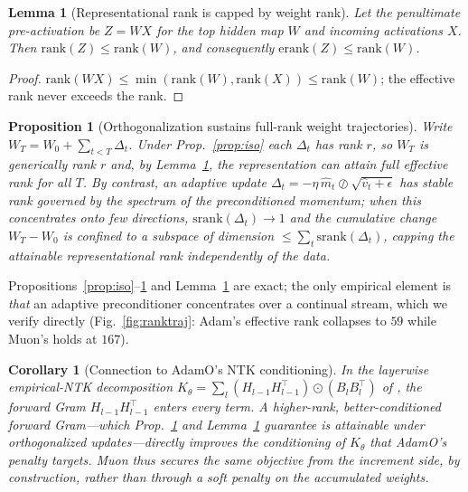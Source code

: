 \documentclass[letterpaper,twocolumn,10pt]{article}
\newtheorem{proposition}{Proposition}
\newtheorem{lemma}{Lemma}
\newtheorem{corollary}{Corollary}
\begin{document}
\begin{lemma}[Representational rank is capped by weight rank]\label{lem:cap}
Let the penultimate pre-activation be $Z=WX$ for the top hidden map $W$ and incoming activations $X$. Then $\mathrm{rank}(Z)\le\mathrm{rank}(W)$, and consequently $\mathrm{erank}(Z)\le\mathrm{rank}(W)$.
\end{lemma}
\begin{proof}
$\mathrm{rank}(WX)\le\min(\mathrm{rank}(W),\mathrm{rank}(X))\le\mathrm{rank}(W)$; the effective rank never exceeds the rank.
\end{proof}

\begin{proposition}[Orthogonalization sustains full-rank weight trajectories]\label{prop:traj}
Write $W_T=W_0+\sum_{t<T}\Delta_t$. Under Prop.~\ref{prop:iso} each $\Delta_t$ has rank $r$, so $W_T$ is generically rank $r$ and, by Lemma~\ref{lem:cap}, the representation can attain full effective rank for \emph{all} $T$. By contrast, an adaptive update $\Delta_t=-\eta\,\hat m_t\oslash\sqrt{\hat v_t+\epsilon}$ has stable rank governed by the spectrum of the preconditioned momentum; when this concentrates onto few directions, $\mathrm{srank}(\Delta_t)\!\to\!1$ and the cumulative change $W_T-W_0$ is confined to a subspace of dimension $\le\sum_t\mathrm{srank}(\Delta_t)$, capping the attainable representational rank independently of the data.
\end{proposition}

Propositions~\ref{prop:iso}--\ref{prop:traj} and Lemma~\ref{lem:cap} are exact; the only empirical element is \emph{that} an adaptive preconditioner concentrates over a continual stream, which we verify directly (Fig.~\ref{fig:ranktraj}: Adam's effective rank collapses to $59$ while Muon's holds at $167$).

\begin{corollary}[Connection to AdamO's NTK conditioning]\label{cor:ntk}
In the layerwise empirical-NTK decomposition $K_\theta=\sum_l (H_{l-1}H_{l-1}^\top)\odot(B_{l}B_{l}^\top)$ of \citet{adamo2026}, the forward Gram $H_{l-1}H_{l-1}^\top$ enters every term. A higher-rank, better-conditioned forward Gram---which Prop.~\ref{prop:traj} and Lemma~\ref{lem:cap} guarantee is \emph{attainable} under orthogonalized updates---directly improves the conditioning of $K_\theta$ that AdamO's penalty targets. Muon thus secures the same objective from the increment side, by construction, rather than through a soft penalty on the accumulated weights.
\end{corollary}
\end{document}
